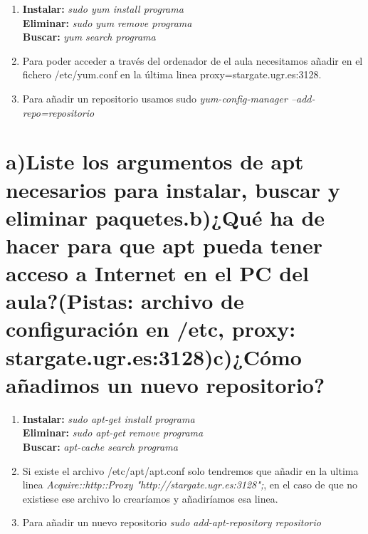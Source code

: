 \begin{enumerate}[label=(\alph*)]
	\item  \textbf{Instalar: } \textit{sudo yum install programa}\\
	\textbf{Eliminar: } \textit{sudo yum remove programa}\\
	\textbf{Buscar: } \textit{yum search programa}
	
	\item Para poder acceder a través del ordenador de el aula necesitamos añadir en el fichero /etc/yum.conf en la última linea proxy=stargate.ugr.es:3128.
	
	\item Para añadir un repositorio usamos sudo \textit{yum-config-manager --add-repo=repositorio} \cite{yum}
\end{enumerate}


\section[Cuestión 2]{a)Liste los argumentos de apt necesarios para instalar, buscar y eliminar paquetes.b)¿Qué ha de hacer para que apt pueda tener acceso a Internet en el PC del aula?(Pistas: archivo de configuración en /etc, proxy: stargate.ugr.es:3128)c)¿Cómo añadimos un nuevo repositorio?}

\begin{enumerate}[label=(\alph*)]
	\item  \textbf{Instalar: } \textit{sudo apt-get install programa}\\
	\textbf{Eliminar: } \textit{sudo apt-get remove programa}\\
	\textbf{Buscar: } \textit{apt-cache search programa}
	
	\item Si existe el archivo /etc/apt/apt.conf solo tendremos que añadir en la ultima linea \textit{Acquire::http::Proxy "http://stargate.ugr.es:3128";}, en el caso de que no existiese ese archivo lo crearíamos y añadiríamos esa linea. \cite{apt}
	
	\item Para añadir un nuevo repositorio \textit{sudo add-apt-repository repositorio}\cite{apt}

\end{enumerate}
